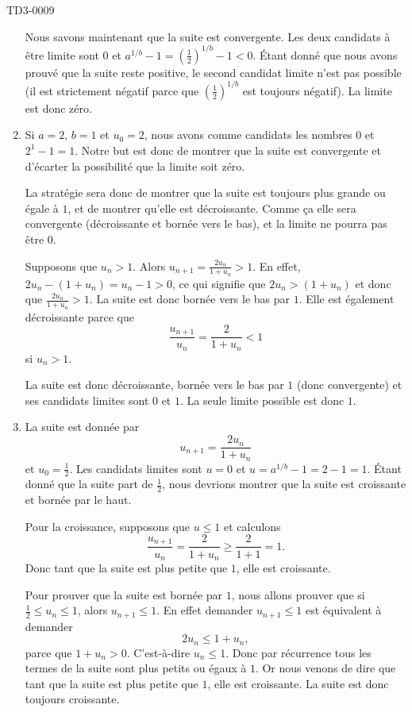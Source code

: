 \begin{corrige}{TD3-0009}
\begin{enumerate}
            Nous savons maintenant que la suite est convergente. Les deux candidats à être limite sont $0$ et $a^{1/b}-1=(\frac{ 1 }{2})^{1/b}-1<0$. Étant donné que nous avons prouvé que la suite reste positive, le second candidat limite n'est pas possible (il est strictement négatif parce que $(\frac{1}{ 2 })^{1/b}$ est toujours négatif). La limite est donc zéro.

		\item
			Si $a=2$, $b=1$ et $u_0=2$, nous avons comme candidats les nombres $0$ et $2^{1}-1=1$. Notre but est donc de montrer que la suite est convergente et d'écarter la possibilité que la limite soit zéro.

			La stratégie sera donc de montrer que la suite est toujours plus grande ou égale à $1$, et de montrer qu'elle est décroissante. Comme ça elle sera convergente (décroissante et bornée vers le bas), et la limite ne pourra pas être $0$.

			Supposons que $u_n>1$. Alors $u_{n+1}=\frac{ 2u_n }{ 1+u_n }>1$. En effet, $2u_n-(1+u_n)=u_n-1>0$, ce qui signifie que $2u_n>(1+u_n)$ et donc que $\frac{ 2u_n }{ 1+u_n }>1$. La suite est donc bornée vers le bas par $1$. Elle est également décroissante parce que
			\begin{equation}
				\frac{ u_{n+1} }{ u_n }=\frac{ 2 }{ 1+u_n }<1
			\end{equation}
			si $u_n>1$.

			La suite est donc décroissante, bornée vers le bas par $1$ (donc convergente) et ses candidats limites sont $0$ et $1$. La seule limite possible est donc $1$.

		\item
			La suite est donnée par
			\begin{equation}
				u_{n+1}=\frac{ 2u_n }{ 1+u_n }
			\end{equation}
			et $u_0=\frac{ 1 }{2}$. Les candidats limites sont $u=0$ et $u=a^{1/b}-1=2-1=1$. Étant donné que la suite part de $\frac{ 1 }{2}$, nous devrions montrer que la suite est croissante et bornée par le haut. 

			Pour la croissance, supposons que $u\leq 1$ et calculons
			\begin{equation}
				\frac{ u_{n+1} }{ u_n }=\frac{ 2 }{ 1+u_n }\geq \frac{ 2 }{ 1+1 }=1.
			\end{equation}
			Donc tant que la suite est plus petite que $1$, elle est croissante.

            Pour prouver que la suite est bornée par $1$, nous allons prouver que si $\frac{ 1 }{2}\leq u_n\leq 1$, alors $u_{n+1}\leq 1$. En effet demander \( u_{n+1}\leq 1\) est équivalent à demander
            \begin{equation}
                2u_n\leq 1+u_n,
            \end{equation}
            parce que \( 1+u_n>0\). C'est-à-dire \( u_n\leq 1\). Donc par récurrence tous les termes de la suite sont plus petits ou égaux à \( 1\). Or nous venons de dire que tant que la suite est plus petite que \( 1\), elle est croissante. La suite est donc toujours croissante.
    

\end{enumerate}
\end{corrige}
